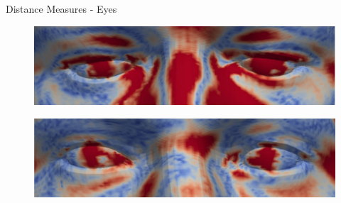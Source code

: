 \documentclass[xcolor=x11names,compress]{beamer}
\begin{document}
\begin{frame}{Distance Measures - Eyes}
\begin{figure}
        \centering
        \includegraphics[width=.8\textwidth]{../resources/img/00029_dist_eyes_0_1_cropped.pdf}
\end{figure}
\begin{figure}
        \centering
        \includegraphics[width=.8\textwidth]{../resources/img/00303_dist_eyes_0_1_cropped.pdf}
\end{figure}
\end{frame}
\end{document}
